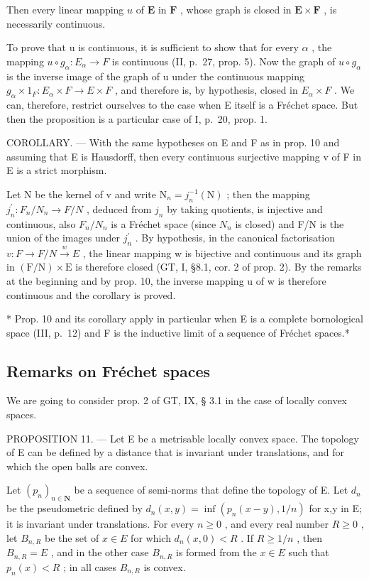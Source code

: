 Then every linear mapping \(u\) of \(\mathbf{E}\) in \(\mathbf{F}\) , whose graph is closed in \(\mathbf{E} \times \mathbf{F}\) , is necessarily continuous.

To prove that u is continuous, it is sufficient to show that for every \(\alpha\) , the mapping \(u \circ g_{\alpha}: E_{\alpha} \to F\) is continuous (II, p.~27, prop. 5). Now the graph of \(u \circ g_{\alpha}\) is the inverse image of the graph of u under the continuous mapping \(g_{\alpha} \times 1_{F}: E_{\alpha} \times F \to E \times F\) , and therefore is, by hypothesis, closed in \(E_{\alpha} \times F\) . We can, therefore, restrict ourselves to the case when E itself is a Fréchet space. But then the proposition is a particular case of I, p.~20, prop. 1.

COROLLARY. --- With the same hypotheses on E and F as in prop. 10 and assuming that E is Hausdorff, then every continuous surjective mapping v of F in E is a strict morphism.

Let N be the kernel of v and write \(\mathrm{N}_{n}=j_{n}^{-1}(\mathrm{N})\) ; then the mapping \(j_{n}^{\prime}:F_{n}/N_{n}\to F/N\) , deduced from \(j_{n}\) by taking quotients, is injective and continuous, also \(F_{n}/N_{n}\) is a Fréchet space (since \(N_{n}\) is closed) and F/N is the union of the images under \(j_{n}^{\prime}\) . By hypothesis, in the canonical factorisation \(v:F\to F/N\stackrel{w}{\to}E\) , the linear mapping w is bijective and continuous and its graph in \((\mathrm{F/N})\times\mathrm{E}\) is therefore closed (GT, I, §8.1, cor. 2 of prop. 2). By the remarks at the beginning and by prop. 10, the inverse mapping u of w is therefore continuous and the corollary is proved.

* Prop. 10 and its corollary apply in particular when E is a complete bornological space (III, p.~12) and F is the inductive limit of a sequence of Fréchet spaces.*

\subsection{Remarks on Fréchet spaces}

We are going to consider prop. 2 of GT, IX, § 3.1 in the case of locally convex spaces.

PROPOSITION 11. --- Let E be a metrisable locally convex space. The topology of E can be defined by a distance that is invariant under translations, and for which the open balls are convex.

Let \((p_{n})_{n\in\mathbf{N}}\) be a sequence of semi-norms that define the topology of E. Let \(d_{n}\) be the pseudometric defined by \(d_{n}(x,y)=\inf(p_{n}(x-y),1/n)\) for x,y in E; it is invariant under translations. For every \(n\geqslant0\) , and every real number \(R\geqslant0\) , let \(B_{n,R}\) be the set of \(x\in E\) for which \(d_{n}(x,0)<R\) . If \(R\geqslant1/n\) , then \(B_{n,R}=E\) , and in the other case \(B_{n,R}\) is formed from the \(x\in E\) such that \(p_{n}(x)<R\) ; in all cases \(B_{n,R}\) is convex.

